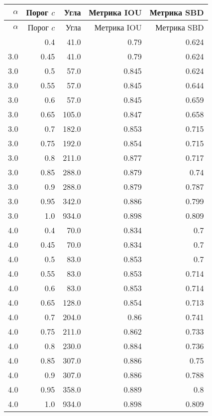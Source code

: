 
\begin{center}
\begin{longtable}{|r|r|r|r|r|}
\hline
\(\alpha\) & Порог \(c\) & Угла & Метрика IOU & Метрика SBD \\
\hline
\endfirsthead
\hline
\(\alpha\) & Порог \(c\) & Угла & Метрика IOU & Метрика SBD \\
\hline
\endhead

\hline
\endfoot

\hline
\endlastfoot
3.0 & 0.4 & 41.0 & 0.79 & 0.624 \\
\hline
3.0 & 0.45 & 41.0 & 0.79 & 0.624 \\
\hline
3.0 & 0.5 & 57.0 & 0.845 & 0.624 \\
\hline
3.0 & 0.55 & 57.0 & 0.845 & 0.644 \\
\hline
3.0 & 0.6 & 57.0 & 0.845 & 0.659 \\
\hline
3.0 & 0.65 & 105.0 & 0.847 & 0.658 \\
\hline
3.0 & 0.7 & 182.0 & 0.853 & 0.715 \\
\hline
3.0 & 0.75 & 192.0 & 0.854 & 0.715 \\
\hline
3.0 & 0.8 & 211.0 & 0.877 & 0.717 \\
\hline
3.0 & 0.85 & 288.0 & 0.879 & 0.74 \\
\hline
3.0 & 0.9 & 288.0 & 0.879 & 0.787 \\
\hline
3.0 & 0.95 & 342.0 & 0.886 & 0.799 \\
\hline
3.0 & 1.0 & 934.0 & 0.898 & 0.809 \\
\hline
4.0 & 0.4 & 70.0 & 0.834 & 0.7 \\
\hline
4.0 & 0.45 & 70.0 & 0.834 & 0.7 \\
\hline
4.0 & 0.5 & 83.0 & 0.853 & 0.7 \\
\hline
4.0 & 0.55 & 83.0 & 0.853 & 0.714 \\
\hline
4.0 & 0.6 & 83.0 & 0.853 & 0.714 \\
\hline
4.0 & 0.65 & 128.0 & 0.854 & 0.713 \\
\hline
4.0 & 0.7 & 204.0 & 0.86 & 0.741 \\
\hline
4.0 & 0.75 & 211.0 & 0.862 & 0.733 \\
\hline
4.0 & 0.8 & 230.0 & 0.884 & 0.736 \\
\hline
4.0 & 0.85 & 307.0 & 0.886 & 0.75 \\
\hline
4.0 & 0.9 & 307.0 & 0.886 & 0.788 \\
\hline
4.0 & 0.95 & 358.0 & 0.889 & 0.8 \\
\hline
4.0 & 1.0 & 934.0 & 0.898 & 0.809 \\

\end{longtable}
\end{center}
